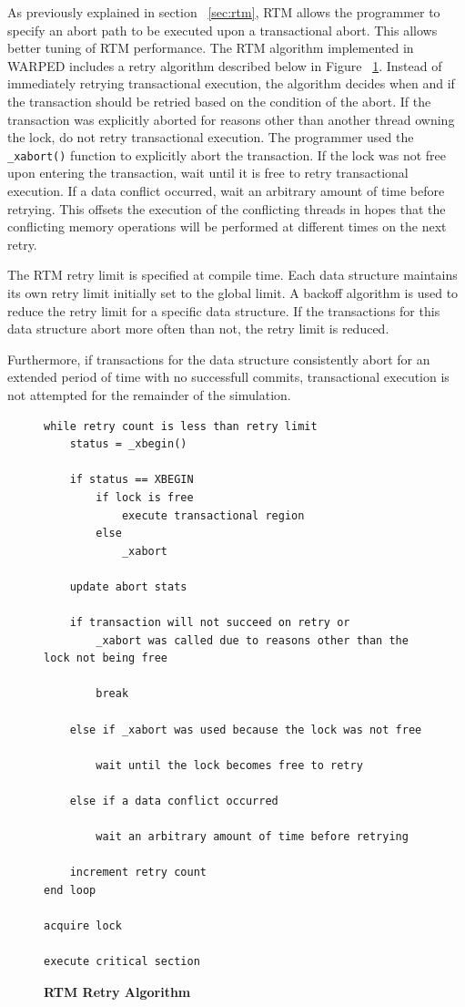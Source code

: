 \documentclass[a4paper]{article}
\begin{document}
As previously explained in section ~\ref{sec:rtm}, RTM allows the programmer to
specify an abort path to be executed upon a transactional abort.  This allows
better tuning of RTM performance.  The RTM algorithm implemented in WARPED
includes a retry algorithm described below in Figure ~\ref{rtm_retry}. Instead
of immediately retrying transactional execution, the algorithm decides when and
if the transaction should be retried based on the condition of the abort.  If
the transaction was explicitly aborted for reasons other than another thread
owning the lock, do not retry transactional execution.  The programmer used the
\texttt{\_xabort()} function to explicitly abort the transaction. If the lock
was not free upon entering the transaction, wait until it is free to retry
transactional execution.  If a data conflict occurred, wait an arbitrary amount
of time before retrying.  This offsets the execution of the conflicting threads
in hopes that the conflicting memory operations will be performed at different
times on the next retry.
\par

The RTM retry limit is specified at compile time.  Each data structure maintains
its own retry limit initially set to the global limit.  A backoff algorithm is
used to reduce the retry limit for a specific data structure.  If the
transactions for this data structure abort more often than not, the retry limit
is reduced.
\par

Furthermore, if transactions for the data structure consistently abort for an
extended period of time with no successfull commits, transactional execution is
not attempted for the remainder of the simulation.  
\par

\linespread{1.0}
\begin{figure}
\begin{verbatim}
while retry count is less than retry limit
    status = _xbegin()

    if status == XBEGIN
        if lock is free
            execute transactional region
        else
            _xabort

    update abort stats

    if transaction will not succeed on retry or 
        _xabort was called due to reasons other than the lock not being free

        break

    else if _xabort was used because the lock was not free

        wait until the lock becomes free to retry

    else if a data conflict occurred
        
        wait an arbitrary amount of time before retrying

    increment retry count
end loop

acquire lock

execute critical section

\end{verbatim}
\linespread{2.0}
\caption{\textbf{RTM Retry Algorithm}}\label{rtm_retry}
\end{figure}
\end{document}

